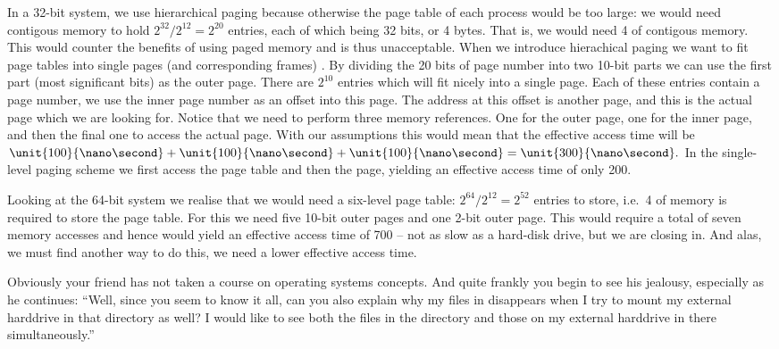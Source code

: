 \documentclass[addpoints]{miunexam}
\begin{document}
\begin{questions}
\begin{solution}
    In a 32-bit system, we use hierarchical paging because otherwise the page 
    table of each process would be too large:
    we would need contigous memory to hold \(2^{32} / 2^{12} = 2^{20}\) 
    entries, each of which being 32 bits, or 4 bytes.
    That is, we would need \unit{4}{\mebi\byte} of contigous memory.
    This would counter the benefits of using paged memory and is thus 
    unacceptable.
    When we introduce hierachical paging we want to fit page tables into single 
    pages (and corresponding frames) \cite[p. 337]{Silberschatz2009osc}.
    By dividing the 20 bits of page number into two 10-bit parts we can use the 
    first part (most significant bits) as the outer page.
    There are \(2^{10}\) entries which will fit nicely into a single page.
    Each of these entries contain a page number, we use the inner page number 
    as an offset into this page.
    The address at this offset is another page, and this is the actual page 
    which we are looking for.
    Notice that we need to perform three memory references.
    One for the outer page, one for the inner page, and then the final one to 
    access the actual page.
    With our assumptions this would mean that the effective access time will be 
    \(\unit{100}{\nano\second} + \unit{100}{\nano\second} 
    + \unit{100}{\nano\second} = \unit{300}{\nano\second}.\)
    In the single-level paging scheme we first access the page table and then 
    the page, yielding an effective access time of only 
    \unit{200}{\nano\second}.

    Looking at the 64-bit system we realise that we would need a six-level page 
    table: \(2^{64} / 2^{12} = 2^{52}\) entries to store, i.e.\ 
    \unit{4}{\tebi\byte} of memory is required to store the page table.
    For this we need five 10-bit outer pages and one 2-bit outer page.
    This would require a total of seven memory accesses and hence would yield 
    an effective access time of \unit{700}{\nano\second} -- not as slow as 
    a hard-disk drive, but we are closing in.
    And alas, we must find another way to do this, we need a lower effective 
    access time.
  \end{solution}

  \question[3]\label{q:mountpoint}
  Obviously your friend has not taken a course on operating systems concepts.
  And quite frankly you begin to see his jealousy, especially as he continues:  
  ``Well, since you seem to know it all, can you also explain why my files in 
  \term{/pub} disappears when I try to mount my external harddrive in that 
  directory as well?  I would like to see both the files in the directory and 
  those on my external harddrive in there simultaneously.''


\end{questions}
\end{document}
